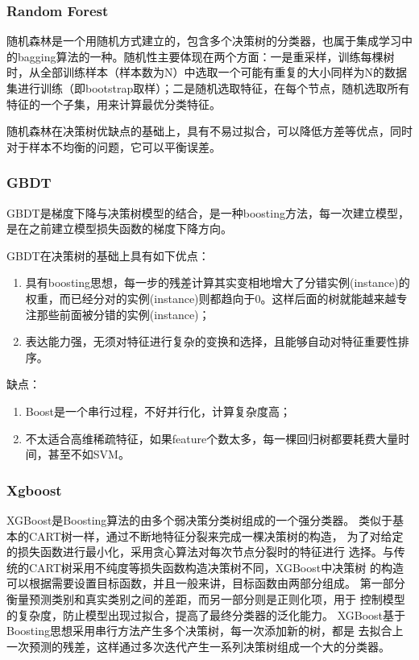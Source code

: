 \documentclass[UTF8]{ctexart}
\begin{document}
\subsubsection{Random Forest}
随机森林是一个用随机方式建立的，包含多个决策树的分类器，也属于集成学习中的bagging算法的一种。随机性主要体现在两个方面：一是重采样，训练每棵树时，从全部训练样本（样本数为N）中选取一个可能有重复的大小同样为N的数据集进行训练（即bootstrap取样）；二是随机选取特征，在每个节点，随机选取所有特征的一个子集，用来计算最优分类特征。

随机森林在决策树优缺点的基础上，具有不易过拟合，可以降低方差等优点，同时对于样本不均衡的问题，它可以平衡误差。


\subsubsection{GBDT}
GBDT是梯度下降与决策树模型的结合，是一种boosting方法，每一次建立模型，是在之前建立模型损失函数的梯度下降方向。

GBDT在决策树的基础上具有如下优点：
\begin{enumerate}[(1)]
	\item 具有boosting思想，每一步的残差计算其实变相地增大了分错实例(instance)的权重，而已经分对的实例(instance)则都趋向于0。这样后面的树就能越来越专注那些前面被分错的实例(instance)；
	\item 表达能力强，无须对特征进行复杂的变换和选择，且能够自动对特征重要性排序。
\end{enumerate}

缺点：
\begin{enumerate}[(1)]
	\item Boost是一个串行过程，不好并行化，计算复杂度高；
	\item 不太适合高维稀疏特征，如果feature个数太多，每一棵回归树都要耗费大量时间，甚至不如SVM。
	
\end{enumerate}

\subsubsection{Xgboost}
XGBoost是Boosting算法的由多个弱决策分类树组成的一个强分类器。
类似于基本的CART树一样，通过不断地特征分裂来完成一棵决策树的构造，
为了对给定的损失函数进行最小化，采用贪心算法对每次节点分裂时的特征进行
选择。与传统的CART树采用不纯度等损失函数构造决策树不同，XGBoost中决策树
的构造可以根据需要设置目标函数，并且一般来讲，目标函数由两部分组成。
第一部分衡量预测类别和真实类别之间的差距，而另一部分则是正则化项，用于
控制模型的复杂度，防止模型出现过拟合，提高了最终分类器的泛化能力。
XGBoost基于Boosting思想采用串行方法产生多个决策树，每一次添加新的树，都是
去拟合上一次预测的残差，这样通过多次迭代产生一系列决策树组成一个大的分类器。
\end{document}
